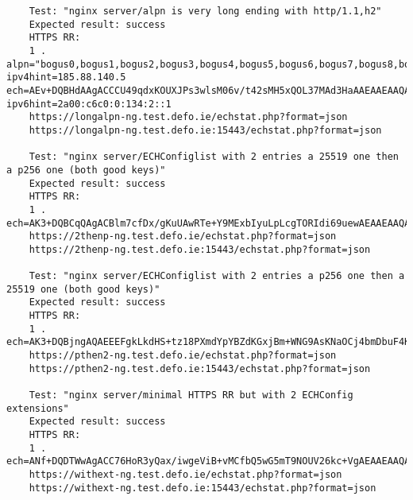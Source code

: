 \begin{verbatim}
    Test: "nginx server/alpn is very long ending with http/1.1,h2"
    Expected result: success
    HTTPS RR:
    1 . alpn="bogus0,bogus1,bogus2,bogus3,bogus4,bogus5,bogus6,bogus7,bogus8,bogus9,bogus10,bogus11,bogus12,bogus13,bogus14,bogus15,bogus16,bogus17,bogus18,bogus19,bogus20,bogus21,bogus22,bogus23,bogus24,bogus25,bogus26,bogus27,bogus28,bogus29,bogus30,bogus31,bogus32,bogus33,bogus34,bogus35,bogus36,bogus37,bogus38,bogus39,bogus40,bogus41,bogus42,bogus43,bogus44,bogus45,bogus46,bogus47,bogus48,bogus49,bogus50,bogus51,bogus52,bogus53,bogus54,bogus55,bogus56,bogus57,bogus58,bogus59,bogus60,bogus61,bogus62,bogus63,bogus64,bogus65,bogus66,bogus67,bogus68,bogus69,bogus70,bogus71,bogus72,bogus73,bogus74,bogus75,bogus76,bogus77,bogus78,bogus79,bogus80,bogus81,bogus82,bogus83,bogus84,bogus85,bogus86,bogus87,bogus88,bogus89,bogus90,bogus91,bogus92,bogus93,bogus94,bogus95,bogus96,bogus97,bogus98,bogus99,http/1.1,h2" ipv4hint=185.88.140.5 ech=AEv+DQBHdAAgACCCU49qdxKOUXJPs3wlsM06v/t42sMH5xQOL37MAd3HaAAEAAEAAQAYb3RoZXJwdWJsaWMudGVzdC5kZWZvLmllAAA= ipv6hint=2a00:c6c0:0:134:2::1
    https://longalpn-ng.test.defo.ie/echstat.php?format=json
    https://longalpn-ng.test.defo.ie:15443/echstat.php?format=json

    Test: "nginx server/ECHConfiglist with 2 entries a 25519 one then a p256 one (both good keys)"
    Expected result: success
    HTTPS RR:
    1 . ech=AK3+DQBCqQAgACBlm7cfDx/gKuUAwRTe+Y9MExbIyuLpLcgTORIdi69uewAEAAEAAQATcHVibGljLnRlc3QuZGVmby5pZQAA/g0AY54AEABBBBYJC5HR0vrc9fD15nWKWAWXShsYwZvljRvQLCjWjgo+G5g27heCsrxxGRo+vlpbNVQXtTl4nq6YxomDhK4jlpwABAACAAMAE3B1YmxpYy50ZXN0LmRlZm8uaWUAAA==
    https://2thenp-ng.test.defo.ie/echstat.php?format=json
    https://2thenp-ng.test.defo.ie:15443/echstat.php?format=json

    Test: "nginx server/ECHConfiglist with 2 entries a p256 one then a 25519 one (both good keys)"
    Expected result: success
    HTTPS RR:
    1 . ech=AK3+DQBjngAQAEEEFgkLkdHS+tz18PXmdYpYBZdKGxjBm+WNG9AsKNaOCj4bmDbuF4KyvHEZGj6+Wls1VBe1OXierpjGiYOEriOWnAAEAAIAAwATcHVibGljLnRlc3QuZGVmby5pZQAA/g0AQqkAIAAgZZu3Hw8f4CrlAMEU3vmPTBMWyMri6S3IEzkSHYuvbnsABAABAAEAE3B1YmxpYy50ZXN0LmRlZm8uaWUAAA==
    https://pthen2-ng.test.defo.ie/echstat.php?format=json
    https://pthen2-ng.test.defo.ie:15443/echstat.php?format=json

    Test: "nginx server/minimal HTTPS RR but with 2 ECHConfig extensions"
    Expected result: success
    HTTPS RR:
    1 . ech=ANf+DQDTWwAgACC76HoR3yQax/iwgeViB+vMCfbQ5wG5mT9NOUV26kc+VgAEAAEAAQATcHVibGljLnRlc3QuZGVmby5pZQCRD8oARjExMTExMTExMTExMTExMTExMTExMTExMTExMTExMTExMTExMTExMTExMTExMTExMTExMTExMTExMTExMTExMTExMTExMQoPywBDMjIyMjIyMjIyMjIyMjIyMjIyMjIyMjIyMjIyMjIyMjIyMjIyMjIyMjIyMjIyMjIyMjIyMjIyMjIyMjIyMjIyMjIyCg==
    https://withext-ng.test.defo.ie/echstat.php?format=json
    https://withext-ng.test.defo.ie:15443/echstat.php?format=json


\end{verbatim}
